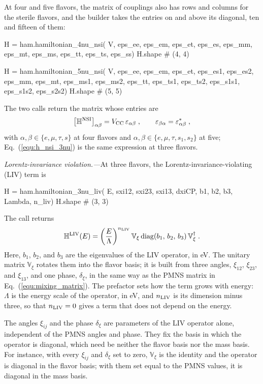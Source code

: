 \documentclass[final,5p,times,twocolumn,sort,compress]{elsarticle}
\makeatletter
\newcommand{\eq}{Eq.}
\DeclareRobustCommand{\_}{%
  \ifmmode\nfss@text{\textunderscore}\else\textunderscore\allowbreak\fi}
\newcommand{\equ}[1]{\eq~(\ref{equ:#1})}
\makeatother
\begin{document}
At four and five flavors, the matrix of couplings also has rows and columns for the sterile flavors, and the builder takes the entries on and above its diagonal, ten and fifteen of them:
\begin{pysnip}
H = ham.hamiltonian_4nu_nsi(
    V, eps_ee, eps_em, eps_et, eps_es,
    eps_mm, eps_mt, eps_ms, eps_tt,
    eps_ts, eps_ss)
H.shape                        # (4, 4)

H = ham.hamiltonian_5nu_nsi(
    V, eps_ee, eps_em, eps_et, eps_es1,
    eps_es2, eps_mm, eps_mt, eps_ms1,
    eps_ms2, eps_tt, eps_ts1, eps_ts2,
    eps_s1s1, eps_s1s2, eps_s2s2)
H.shape                        # (5, 5)
\end{pysnip}
The two calls return the matrix whose entries are
\begin{equation}
 \label{equ:h_nsi_45nu}
 \left[\mathbb{H}^{\rm NSI}\right]_{\alpha\beta}
 =
 V_{\rm CC}\, \varepsilon_{\alpha\beta} \;,
 \qquad
 \varepsilon_{\beta\alpha} = \varepsilon_{\alpha\beta}^\ast \;,
\end{equation}
with $\alpha, \beta \in \{e, \mu, \tau, s\}$ at four flavors and $\alpha, \beta \in \{e, \mu, \tau, s_1, s_2\}$ at five; \equ{h_nsi_3nu} is the same expression at three flavors.

\smallskip

\textit{Lorentz-invariance violation.---}At three flavors, the Lorentz-invariance-violating (LIV) term is
\begin{pysnip}
H = ham.hamiltonian_3nu_liv(
    E, sxi12, sxi23, sxi13, dxiCP,
    b1, b2, b3, Lambda, n_liv)
H.shape                        # (3, 3)
\end{pysnip}
The call returns
\begin{equation}
 \label{equ:h_liv_3nu}
 \mathbb{H}^{\rm LIV}(E)
 =
 \left(\frac{E}{\Lambda}\right)^{n_{\rm LIV}}
 \mathbb{V}_\xi\,
 {\rm diag}\!\left(b_1,\, b_2,\, b_3\right)
 \mathbb{V}_\xi^\dagger \;.
\end{equation}
Here, $b_1$, $b_2$, and $b_3$ are the eigenvalues of the LIV operator, in eV. The unitary matrix $\mathbb{V}_\xi$ rotates them into the flavor basis; it is built from three angles, $\xi_{12}$, $\xi_{23}$, and $\xi_{13}$, and one phase, $\delta_\xi$, in the same way as the PMNS matrix in \equ{mixing_matrix}. The prefactor sets how the term grows with energy: $\Lambda$ is the energy scale of the operator, in eV, and $n_{\rm LIV}$ is its dimension minus three, so that $n_{\rm LIV} = 0$ gives a term that does not depend on the energy.

The angles $\xi_{ij}$ and the phase $\delta_\xi$ are parameters of the LIV operator alone, independent of the PMNS angles and phase. They fix the basis in which the operator is diagonal, which need be neither the flavor basis nor the mass basis. For instance, with every $\xi_{ij}$ and $\delta_\xi$ set to zero, $\mathbb{V}_\xi$ is the identity and the operator is diagonal in the flavor basis; with them set equal to the PMNS values, it is diagonal in the mass basis.
\end{document}
